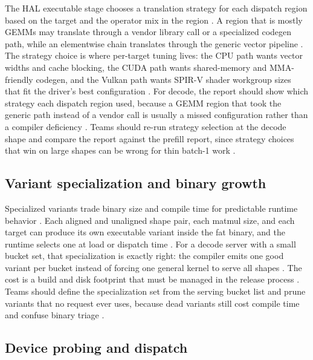 The HAL executable stage chooses a translation strategy for each dispatch region based on the target and the operator mix in the region \citep{iree2024,chen2020compilerbasedhardw}. A region that is mostly GEMMs may translate through a vendor library call or a specialized codegen path, while an elementwise chain translates through the generic vector pipeline \citep{iree2024,patel2025llminference}. The strategy choice is where per-target tuning lives: the CPU path wants vector widths and cache blocking, the CUDA path wants shared-memory and MMA-friendly codegen, and the Vulkan path wants SPIR-V shader workgroup sizes that fit the driver's best configuration \citep{iree2024,semianalysis2024tma}. For decode, the report should show which strategy each dispatch region used, because a GEMM region that took the generic path instead of a vendor call is usually a missed configuration rather than a compiler deficiency \citep{memoryfloor2026,taxbreak2026}. Teams should re-run strategy selection at the decode shape and compare the report against the prefill report, since strategy choices that win on large shapes can be wrong for thin batch-1 work \citep{kwon2023vllm,patel2025llminference}.

\subsection{Variant specialization and binary growth}

Specialized variants trade binary size and compile time for predictable runtime behavior \citep{iree2024,memoryfloor2026}. Each aligned and unaligned shape pair, each matmul size, and each target can produce its own executable variant inside the fat binary, and the runtime selects one at load or dispatch time \citep{iree2024,patel2025llminference}. For a decode server with a small bucket set, that specialization is exactly right: the compiler emits one good variant per bucket instead of forcing one general kernel to serve all shapes \citep{kwon2023vllm,taxbreak2026}. The cost is a build and disk footprint that must be managed in the release process \citep{chen2020compilerbasedhardw,memoryfloor2026}. Teams should define the specialization set from the serving bucket list and prune variants that no request ever uses, because dead variants still cost compile time and confuse binary triage \citep{patel2025llminference,memoryfloor2026}.

\subsection{Device probing and dispatch}

